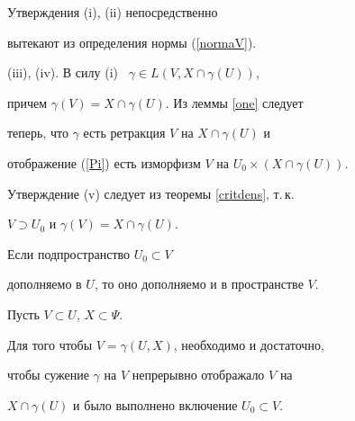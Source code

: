 \begin{pf}


Утверждения (i), (ii) непосредственно


вытекают из определения нормы (\ref{normaV}).





(iii), (iv). В силу (i) \ $\gamma \in L(V, X \cap \gamma(U))$,


причем $\gamma(V)=X \cap \gamma(U)$. Из леммы \ref{one} следует


теперь, что $\gamma$ есть ретракция $V$ на $X \cap \gamma(U)$ и


отображение (\ref{Pi}) есть изморфизм $V$ на $U_0 \times (X \cap


\gamma(U))$.





Утверждение (v) следует из теоремы \ref{critdens}, т.\,к.


$V \supset U_0$ и $\gamma(V)=X \cap \gamma(U)$.


\end{pf}





\begin{notenonum}


Если подпространство $U_0 \subset V$


дополняемо в $U$, то оно дополняемо и в пространстве $V$.


\end{notenonum}





\begin{cor}


Пусть $V \subset U$, $X \subset \Psi$.


Для того чтобы $V=\gamma (U, X)$, необходимо и достаточно,


чтобы сужение $\gamma$ на $V$ непрерывно отображало $V$ на


$X \cap \gamma(U)$ и было выполнено включение $U_0 \subset V$.


\end{cor}





